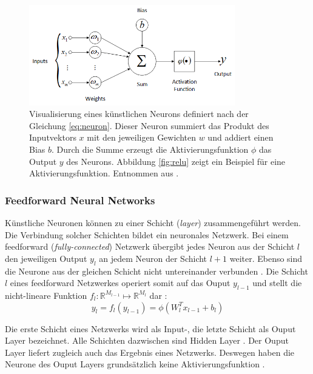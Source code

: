 \begin{figure}
	\centering
	\includegraphics[width=0.8\textwidth]{images/ann_conv/neuron.png}
	\caption{Visualisierung eines künstlichen Neurons definiert nach der Gleichung \ref{eq:neuron}. Dieser Neuron summiert das Produkt des Inputvektors $x$ mit den jeweiligen Gewichten $w$ und addiert einen Bias $b$. Durch die Summe erzeugt die Aktivierungsfunktion $\phi$ das Output $y$ des Neurons. Abbildung \ref{fig:relu} zeigt ein Beispiel für eine Aktivierungsfunktion. Entnommen aus \cite{deoliveiraSystemBasedArtificial2017}. }
	\label{fig:neuron}
\end{figure}

\subsubsection{Feedforward Neural Networks}
\label{sec:feedforwardNN}
Künstliche Neuronen können zu einer Schicht (\textit{layer}) zusammengeführt werden. Die Verbindung solcher Schichten bildet ein neuronales Netzwerk.
Bei einem feedforward (\textit{fully-connected}) Netzwerk übergibt jedes Neuron aus der Schicht $l$ den jeweiligen Output $y_{l}$ an jedem Neuron der Schicht $l+1$ weiter. Ebenso sind die Neurone aus der gleichen Schicht nicht untereinander verbunden \cite{goodfellowDeepLearning2016}.
Die Schicht $l$ eines feedforward Netzwerkes operiert somit auf das Ouput $y_{l-1}$ und stellt die nicht-lineare Funktion $f_l :  \mathbb{R}^{M_{l-1}} \mapsto \mathbb{R}^{M_l}$ dar \cite{bauckhageInformedMachineLearning}:
\begin{equation}
\label{eq:layer}
y_l = f_l(y_{l-1}) = \phi(W^T_lx_{l-1}+b_{l})
\end{equation}


Die erste Schicht eines Netzwerks wird als Input-, die letzte Schicht als Ouput Layer bezeichnet. Alle Schichten dazwischen sind Hidden Layer \cite{goodfellowDeepLearning2016}. Der Ouput Layer liefert zugleich auch das Ergebnis eines Netzwerks. Deswegen haben die Neurone des Ouput Layers grundsätzlich keine Aktivierungsfunktion \cite{johnsonCS231nConvolutionalNeural}.


